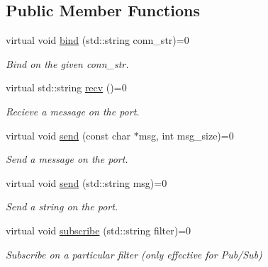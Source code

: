\subsection*{Public Member Functions}
\begin{DoxyCompactItemize}
\item 
\hypertarget{classZmqIn_ad6037a187635f7d46bab5da961156751}{virtual void \hyperlink{classZmqIn_ad6037a187635f7d46bab5da961156751}{bind} (std\-::string conn\-\_\-str)=0}\label{classZmqIn_ad6037a187635f7d46bab5da961156751}

\begin{DoxyCompactList}\small\item\em Bind on the given conn\-\_\-str. \end{DoxyCompactList}\item 
\hypertarget{classZmqIn_a375de593defd4c2cf3adebad063950fe}{virtual std\-::string \hyperlink{classZmqIn_a375de593defd4c2cf3adebad063950fe}{recv} ()=0}\label{classZmqIn_a375de593defd4c2cf3adebad063950fe}

\begin{DoxyCompactList}\small\item\em Recieve a message on the port. \end{DoxyCompactList}\item 
\hypertarget{classZmqIn_ad2a35cc76a5b0b2412fda5418f708e60}{virtual void \hyperlink{classZmqIn_ad2a35cc76a5b0b2412fda5418f708e60}{send} (const char $\ast$msg, int msg\-\_\-size)=0}\label{classZmqIn_ad2a35cc76a5b0b2412fda5418f708e60}

\begin{DoxyCompactList}\small\item\em Send a message on the port. \end{DoxyCompactList}\item 
\hypertarget{classZmqIn_adf4165c263ddc5b68099b93b9f37f592}{virtual void \hyperlink{classZmqIn_adf4165c263ddc5b68099b93b9f37f592}{send} (std\-::string msg)=0}\label{classZmqIn_adf4165c263ddc5b68099b93b9f37f592}

\begin{DoxyCompactList}\small\item\em Send a string on the port. \end{DoxyCompactList}\item 
\hypertarget{classZmqIn_a1b7ed3f43e1796a5a0cdd090f69ae932}{virtual void \hyperlink{classZmqIn_a1b7ed3f43e1796a5a0cdd090f69ae932}{subscribe} (std\-::string filter)=0}\label{classZmqIn_a1b7ed3f43e1796a5a0cdd090f69ae932}

\begin{DoxyCompactList}\small\item\em Subscribe on a particular filter (only effective for Pub/\-Sub) \end{DoxyCompactList}\end{DoxyCompactItemize}


